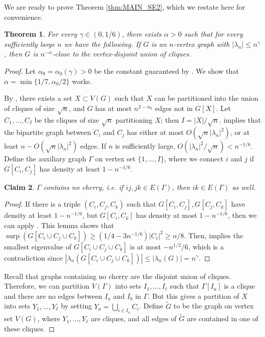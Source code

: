 \documentclass[11pt]{article}
\theoremstyle{plain}
\newtheorem{theorem}{Theorem}[section]
\newtheorem{claim}[theorem]{Claim}
\theoremstyle{definition}
\DeclareMathOperator{\surp}{surp}
\begin{document}
We are ready to prove Theorem \ref{thm:MAIN_SE2}, which we restate here for convenience.

\begin{theorem}
For every $\gamma\in (0, 1/6)$, there exists $\alpha>0$ such that for every sufficiently large $n$ we have the following. If $G$ is an $n$-vertex graph with $|\lambda_n|\leq n^{\gamma}$, then $G$ is $n^{-\alpha}$-close to the vertex-disjoint union of cliques.
\end{theorem}

\begin{proof}
    Let $\alpha_0=\alpha_0(\gamma)>0$ be the constant guaranteed by . 
    We show that $\alpha=\min\{1/7,\alpha_0/2\}$ works.
    
    By , there exists a set $X\subset V(G)$ such that $X$ can be partitioned into the union of cliques of size $\sqrt{n}$, and $G$ has at most $n^{2-\alpha_0}$ edges not in $G[X]$.
    Let $C_1,\dots,C_I$ be the cliques of size $\sqrt{n}$ partitioning $X$; then $I=|X|/\sqrt{n}$.  
     implies that the bipartite graph between $C_i$ and $C_j$ has either at most $O(\sqrt{n}|\lambda_n|^2)$, or at least $n-O(\sqrt{n}|\lambda_n|^2)$ edges. 
    If $n$ is sufficiently large, $O(|\lambda_n|^2/\sqrt{n})<n^{-1/6}$. Define the auxiliary graph $\Gamma$ on vertex set $\{1,\dots,I\}$, where we connect $i$ and $j$ if $G[C_i,C_j]$ has density at least $1-n^{-1/6}$.
    
    \begin{claim}
    $\Gamma$ contains no cherry, i.e. if $ij, jk\in E(\Gamma)$, then $ik\in E(\Gamma)$ as well.
    \end{claim}
    
    \begin{proof}
        If there is a triple $(C_i,C_j,C_k)$ such that $G[C_i,C_j], G[C_j,C_k]$ have density at least $1-n^{-1/6}$, but $G[C_i,C_k]$ has density at most $1-n^{-1/6}$, then we can apply . 
        This lemma shows that $\surp(G[C_i\cup C_j\cup C_k])\geq (1/4-3n^{-1/6})|C_i|^2\geq n/8$. 
        Then,  implies the smallest eigenvalue of $G[C_i\cup C_j\cup C_k]$ is at most $-n^{1/2}/6$, which is a contradiction since $|\lambda_n(G[C_i\cup C_j\cup C_k])|\leq|\lambda_n(G)|=n^\gamma$. 
    \end{proof}
    
    Recall that graphs containing no cherry are the disjoint union of cliques. 
    Therefore, we can partition $V(\Gamma)$ into sets $I_1,\dots,I_\ell$ such that $\Gamma[I_a]$ is a clique and there are no edges between $I_a$ and $I_b$ in $\Gamma$. 
    But this gives a partition of $X$ into sets $Y_1,\dots,Y_\ell$ by setting $Y_a=\bigcup_{i\in I_a}C_i$. 
    Define $\widetilde{G}$ to be the graph on vertex set $V(G)$, where $Y_1,\dots,Y_\ell$ are cliques, and all edges of $\widetilde{G}$ are contained in one of these cliques.
    

\end{proof}
\end{document}
